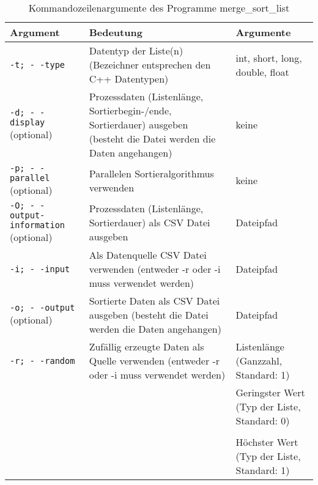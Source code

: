 \begin{table}[h]
\begin{tabular}{|p{5cm}|p{5cm}|p{4cm}|}
\hline
\textbf{Argument} & \textbf{Bedeutung} & \textbf{Argumente}\\
\hline
\texttt{-t; - -type} & Datentyp der Liste(n) (Bezeichner entsprechen den C++ Datentypen)& int, short, long, double, float\\
\hline
\texttt{-d; - -display} (optional) & Prozessdaten (Listenlänge, Sortierbegin-/ende, Sortierdauer) ausgeben (besteht die Datei werden die Daten angehangen)& keine\\
\hline
\texttt{-p; - -parallel} (optional) & Parallelen Sortieralgorithmus verwenden& keine\\
\hline
\texttt{-O; \mbox{- -output-information}} (optional) & Prozessdaten (Listenlänge, Sortierdauer) als \ac{CSV} Datei ausgeben& Dateipfad\\
\hline
\texttt{-i; \mbox{- -input}} & Als Datenquelle \ac{CSV} Datei verwenden (entweder -r oder -i muss verwendet werden)& Dateipfad\\
\hline
\texttt{-o; \mbox{- -output}} (optional) & Sortierte Daten als \ac{CSV} Datei ausgeben (besteht die Datei werden die Daten angehangen)& Dateipfad\\
\hline
\texttt{-r; \mbox{- -random}} & Zufällig erzeugte Daten als Quelle verwenden (entweder -r oder -i muss verwendet werden)& Listenlänge (Ganzzahl, Standard: 1)\\
&& Geringster Wert (Typ der Liste, Standard: 0)\\&&\\
&& Höchster Wert (Typ der Liste, Standard: 1)\\
\hline
\end{tabular}
\caption{Kommandozeilenargumente des Programme merge\_sort\_list}
\label{arguments_merge_sort_list}
\end{table}



